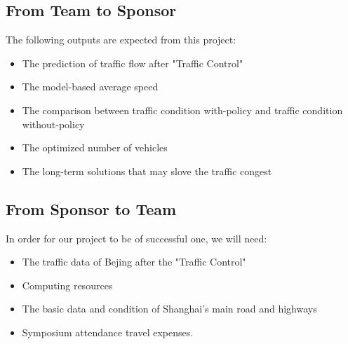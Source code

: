 \documentclass[12pt,letterpaper]{article}
\theoremstyle{definition}
\begin{document}
\subsection{From Team to Sponsor} %
The following outputs are expected from this project:
\begin{itemize}
    \item The prediction of traffic flow after "Traffic Control" 
    \item The model-based average speed
    \item The comparison between traffic condition with-policy and traffic condition without-policy
    \item The optimized number of vehicles 
    \item The long-term solutions that may slove the traffic congest
\end{itemize}

\subsection{From Sponsor to Team} %

In order for our project to be of successful one, we will need:
\begin{itemize}
    \item The traffic data of Bejing after the "Traffic Control"
    \item Computing resources
    \item The basic data and condition of Shanghai's main road and highways 
    \item Symposium attendance travel expenses.
\end{itemize}
\end{document}
